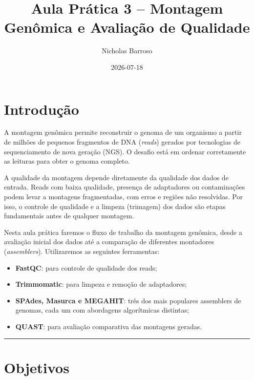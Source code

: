 \documentclass[
  brazilian,
  letterpaper,
  DIV=11,
  numbers=noendperiod]{scrartcl}
\title{Aula Prática 3 -- Montagem Genômica e Avaliação de Qualidade}
\author{Nicholas Barroso}
\date{2026-07-18}
\providecommand{\tightlist}{%
  \setlength{\itemsep}{0pt}\setlength{\parskip}{0pt}}
\renewcommand*\contentsname{Índice}
\newcommand\contentsname{Índice}
\begin{document}
\maketitle

\renewcommand*\contentsname{Índice}
{
\setcounter{tocdepth}{3}
\tableofcontents
}

\section{Introdução}\label{introduuxe7uxe3o}

A montagem genômica permite reconstruir o genoma de um organismo a
partir de milhões de pequenos fragmentos de DNA (\emph{reads}) gerados
por tecnologias de sequenciamento de nova geração (NGS). O desafio está
em ordenar corretamente as leituras para obter o genoma completo.

A qualidade da montagem depende diretamente da qualidade dos dados de
entrada. Reads com baixa qualidade, presença de adaptadores ou
contaminações podem levar a montagens fragmentadas, com erros e regiões
não resolvidas. Por isso, o controle de qualidade e a limpeza (trimagem)
dos dados são etapas fundamentais antes de qualquer montagem.

Nesta aula prática faremos o fluxo de trabalho da montagem genômica,
desde a avaliação inicial dos dados até a comparação de diferentes
montadores (\emph{assemblers}). Utilizaremos as seguintes ferramentas:

\begin{itemize}
\tightlist
\item
  \textbf{FastQC}: para controle de qualidade dos reads;
\item
  \textbf{Trimmomatic}: para limpeza e remoção de adaptadores;
\item
  \textbf{SPAdes, Masurca e MEGAHIT}: três dos mais populares assemblers
  de genomas, cada um com abordagens algorítmicas distintas;
\item
  \textbf{QUAST}: para avaliação comparativa das montagens geradas.
\end{itemize}

\begin{center}\rule{0.5\linewidth}{0.5pt}\end{center}

\section{Objetivos}\label{objetivos}
\end{document}
